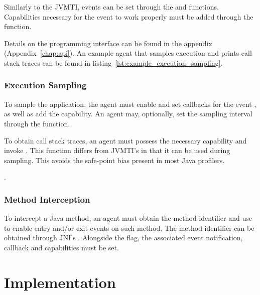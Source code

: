 Similarly to the JVMTI, events can be set through the  and  functions. Capabilities necessary for the event to work properly must be added through the  function.

Details on the programming interface can be found in the appendix (Appendix~\ref{chap:api}). An example agent that samples execution and prints call stack traces can be found in listing~\ref{lst:example_execution_sampling}.

\subsubsection*{Execution Sampling}

To sample the application, the agent must enable and set callbacks for the event , as well as add the  capability. An agent may, optionally, set the sampling interval through the  function.


To obtain call stack traces, an agent must possess the necessary capability and invoke . This function differs from JVMTI's  in that it can be used during sampling. This avoids the safe-point bias present in most Java profilers.


.

\subsubsection*{Method Interception}

To intercept a Java method, an agent must obtain the method identifier and use  to enable entry and/or exit events on such method. The method identifier can be obtained through JNI's . Alongside the flag, the associated event notification, callback and capabilities must be set.

\section{Implementation} \label{sec:impl}

